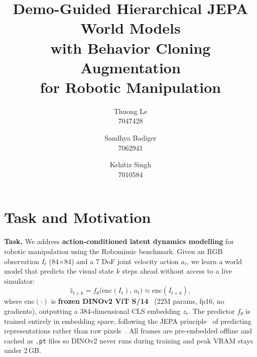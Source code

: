 \documentclass[10pt,twocolumn,letterpaper]{article}
\begin{document}
\title{Demo-Guided Hierarchical JEPA World Models\\with Behavior Cloning Augmentation\\for Robotic Manipulation}

\author{
Thuong Le \\ 7047428 \and
Sandhya Badiger \\ 7062941 \and
Kshitiz Singh \\ 7010584
}
\maketitle

\section{Task and Motivation}

\noindent\textbf{Task.}
We address \textbf{action-conditioned latent dynamics modelling} for robotic manipulation using the Robomimic benchmark.
Given an RGB observation $I_t$ (84$\times$84) and a 7 DoF joint velocity action $a_t$, we learn a world model that predicts the visual state $k$ steps ahead without access to a live simulator:
\begin{equation}
  \hat{z}_{t+k} = f_\theta\!\bigl(\mathrm{enc}(I_t),\,a_t\bigr) \approx \mathrm{enc}(I_{t+k}),
\end{equation}
where $\mathrm{enc}(\cdot)$ is \textbf{frozen DINOv2 ViT S/14}~\cite{dinov2} (22M params, fp16, no gradients), outputting a 384-dimensional CLS embedding $z_t$.
The predictor $f_\theta$ is trained entirely in embedding space, following the JEPA principle~\cite{ijepa} of predicting representations rather than raw pixels~\cite{ho2022videodiffusion,he2022mae}.
All frames are pre-embedded offline and cached as \texttt{.pt} files so DINOv2 never runs during training and peak VRAM stays under 2\,GB.
\end{document}
